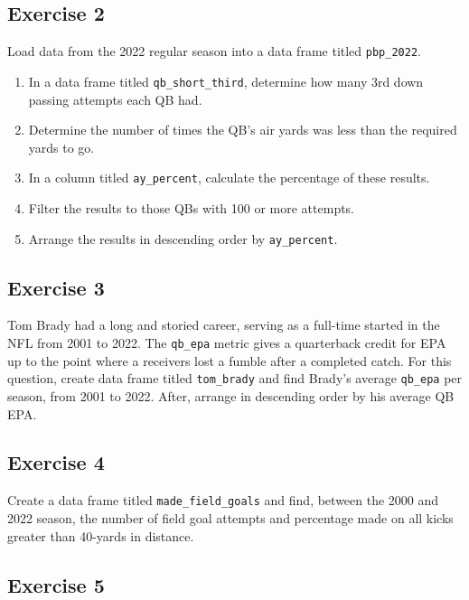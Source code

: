 \documentclass[
  letterpaper,
]{krantz}
\providecommand{\tightlist}{%
  \setlength{\itemsep}{0pt}\setlength{\parskip}{0pt}}\usepackage{longtable,booktabs,array}
\begin{document}
\hypertarget{exercise-2-1}{%
\subsection{Exercise 2}\label{exercise-2-1}}

Load data from the 2022 regular season into a data frame titled
\texttt{pbp\_2022}.

\begin{enumerate}
\def\labelenumi{\arabic{enumi}.}
\tightlist
\item
  In a data frame titled \texttt{qb\_short\_third}, determine how many
  3rd down passing attempts each QB had.
\item
  Determine the number of times the QB's air yards was less than the
  required yards to go.
\item
  In a column titled \texttt{ay\_percent}, calculate the percentage of
  these results.
\item
  Filter the results to those QBs with 100 or more attempts.
\item
  Arrange the results in descending order by \texttt{ay\_percent}.
\end{enumerate}

\hypertarget{exercise-3-1}{%
\subsection{Exercise 3}\label{exercise-3-1}}

Tom Brady had a long and storied career, serving as a full-time started
in the NFL from 2001 to 2022. The \texttt{qb\_epa} metric gives a
quarterback credit for EPA up to the point where a receivers lost a
fumble after a completed catch. For this question, create data frame
titled \texttt{tom\_brady} and find Brady's average \texttt{qb\_epa} per
season, from 2001 to 2022. After, arrange in descending order by his
average QB EPA.

\hypertarget{exercise-4-1}{%
\subsection{Exercise 4}\label{exercise-4-1}}

Create a data frame titled \texttt{made\_field\_goals} and find, between
the 2000 and 2022 season, the number of field goal attempts and
percentage made on all kicks greater than 40-yards in distance.

\hypertarget{exercise-5-1}{%
\subsection{Exercise 5}\label{exercise-5-1}}
\end{document}
